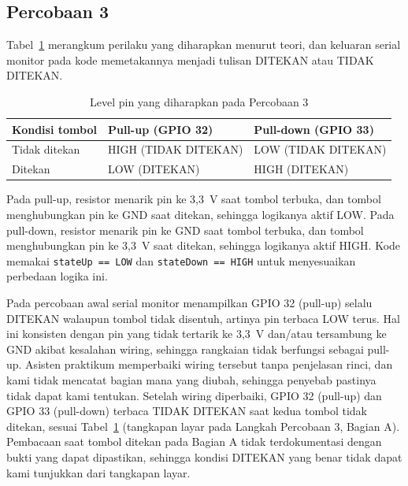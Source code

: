 \subsection{Percobaan 3}
Tabel~\ref{tab:pullup} merangkum perilaku yang diharapkan menurut teori, dan keluaran serial monitor pada kode memetakannya menjadi tulisan DITEKAN atau TIDAK DITEKAN.
\begin{table}[H]
	\centering
	\caption{Level pin yang diharapkan pada Percobaan 3}
	\label{tab:pullup}
	\begin{tabular}{|l|l|l|}
		\hline
		\textbf{Kondisi tombol} & \textbf{Pull-up (GPIO 32)} & \textbf{Pull-down (GPIO 33)} \\ \hline
		Tidak ditekan & HIGH (TIDAK DITEKAN) & LOW (TIDAK DITEKAN) \\ \hline
		Ditekan & LOW (DITEKAN) & HIGH (DITEKAN) \\ \hline
	\end{tabular}
\end{table}
Pada pull-up, resistor menarik pin ke 3,3~V saat tombol terbuka, dan tombol menghubungkan pin ke GND saat ditekan, sehingga logikanya aktif LOW. Pada pull-down, resistor menarik pin ke GND saat tombol terbuka, dan tombol menghubungkan pin ke 3,3~V saat ditekan, sehingga logikanya aktif HIGH. Kode memakai \texttt{stateUp == LOW} dan \texttt{stateDown == HIGH} untuk menyesuaikan perbedaan logika ini.

Pada percobaan awal serial monitor menampilkan GPIO 32 (pull-up) selalu DITEKAN walaupun tombol tidak disentuh, artinya pin terbaca LOW terus. Hal ini konsisten dengan pin yang tidak tertarik ke 3,3~V dan/atau tersambung ke GND akibat kesalahan wiring, sehingga rangkaian tidak berfungsi sebagai pull-up. Asisten praktikum memperbaiki wiring tersebut tanpa penjelasan rinci, dan kami tidak mencatat bagian mana yang diubah, sehingga penyebab pastinya tidak dapat kami tentukan. Setelah wiring diperbaiki, GPIO 32 (pull-up) dan GPIO 33 (pull-down) terbaca TIDAK DITEKAN saat kedua tombol tidak ditekan, sesuai Tabel~\ref{tab:pullup} (tangkapan layar pada Langkah Percobaan 3, Bagian A). Pembacaan saat tombol ditekan pada Bagian A tidak terdokumentasi dengan bukti yang dapat dipastikan, sehingga kondisi DITEKAN yang benar tidak dapat kami tunjukkan dari tangkapan layar.


